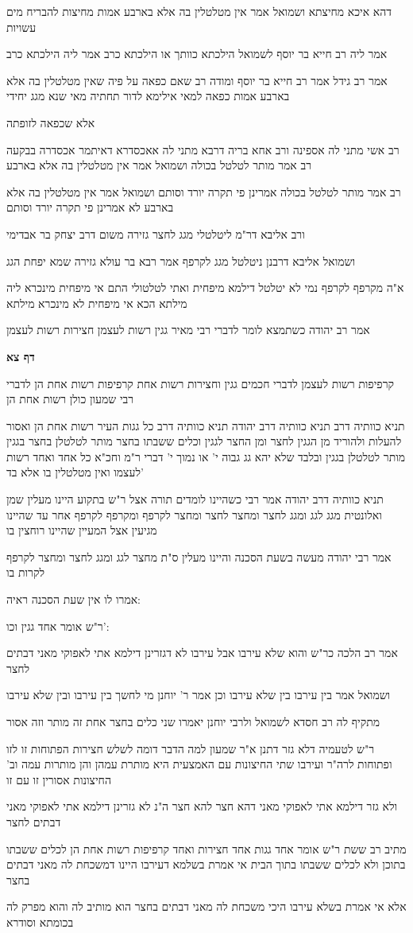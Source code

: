 \documentclass[12pt, openany]{book}
\newcommand{\sethebfont}{
\fontsize{10.5pt}{21.0pt} \selectfont
}
\newcommand{\textblock}[1]{
{\sethebfont #1\\}	
}
\newcommand{\sectname}{}
\newcommand{\newsection}[1]{
	\addcontentsline{toc}{section}{#1}
	\renewcommand{\sectname}{#1}	
	\vspace{-\baselineskip}
	\begin{center}
		\textbf{%
\fontsize{16pt}{16pt}\selectfont
			#1}
	\end{center}
	\vspace{-\baselineskip}
	\nopagebreak
}
\begin{document}
\textblock{דהא איכא מחיצתא ושמואל אמר אין מטלטלין בה אלא בארבע אמות מחיצות להבריח מים עשויות}
\textblock{אמר ליה רב חייא בר יוסף לשמואל הילכתא כוותך או הילכתא כרב אמר ליה הילכתא כרב}
\textblock{אמר רב גידל אמר רב חייא בר יוסף ומודה רב שאם כפאה על פיה שאין מטלטלין בה אלא בארבע אמות כפאה למאי אילימא לדור תחתיה מאי שנא מגג יחידי}
\textblock{אלא שכפאה לזופתה}
\textblock{רב אשי מתני לה אספינה ורב אחא בריה דרבא מתני לה אאכסדרא דאיתמר אכסדרה בבקעה רב אמר מותר לטלטל בכולה ושמואל אמר אין מטלטלין בה אלא בארבע}
\textblock{רב אמר מותר לטלטל בכולה אמרינן פי תקרה יורד וסותם ושמואל אמר אין מטלטלין בה אלא בארבע לא אמרינן פי תקרה יורד וסותם}
\textblock{ורב אליבא דר"מ ליטלטלי מגג לחצר גזירה משום דרב יצחק בר אבדימי}
\textblock{ושמואל אליבא דרבנן ניטלטל מגג לקרפף אמר רבא בר עולא גזירה שמא יפחת הגג}
\textblock{א"ה מקרפף לקרפף נמי לא יטלטל דילמא מיפחית ואתי לטלטולי התם אי מיפחית מינכרא ליה מילתא הכא אי מיפחית לא מינכרא מילתא}
\textblock{אמר רב יהודה כשתמצא לומר לדברי רבי מאיר גגין רשות לעצמן חצירות רשות לעצמן}
\newsection{דף צא}
\textblock{קרפיפות רשות לעצמן לדברי חכמים גגין וחצירות רשות אחת קרפיפות רשות אחת הן לדברי רבי שמעון כולן רשות אחת הן}
\textblock{תניא כוותיה דרב תניא כוותיה דרב יהודה תניא כוותיה דרב כל גגות העיר רשות אחת הן ואסור להעלות ולהוריד מן הגגין לחצר ומן החצר לגגין וכלים ששבתו בחצר מותר לטלטלן בחצר בגגין מותר לטלטלן בגגין ובלבד שלא יהא גג גבוה י' או נמוך י' דברי ר"מ וחכ"א כל אחד ואחד רשות לעצמו ואין מטלטלין בו אלא בד'}
\textblock{תניא כוותיה דרב יהודה אמר רבי כשהיינו לומדים תורה אצל ר"ש בתקוע היינו מעלין שמן ואלונטית מגג לגג ומגג לחצר ומחצר לחצר ומחצר לקרפף ומקרפף לקרפף אחר עד שהיינו מגיעין אצל המעיין שהיינו רוחצין בו}
\textblock{אמר רבי יהודה מעשה בשעת הסכנה והיינו מעלין ס"ת מחצר לגג ומגג לחצר ומחצר לקרפף לקרות בו}
\textblock{אמרו לו אין שעת הסכנה ראיה:}
\textblock{ר"ש אומר אחד גגין וכו':}
\textblock{אמר רב הלכה כר"ש והוא שלא עירבו אבל עירבו לא דגזרינן דילמא אתי לאפוקי מאני דבתים לחצר}
\textblock{ושמואל אמר בין עירבו בין שלא עירבו וכן אמר ר' יוחנן מי לחשך בין עירבו ובין שלא עירבו}
\textblock{מתקיף לה רב חסדא לשמואל ולרבי יוחנן יאמרו שני כלים בחצר אחת זה מותר וזה אסור}
\textblock{ר"ש לטעמיה דלא גזר דתנן א"ר שמעון למה הדבר דומה לשלש חצירות הפתוחות זו לזו ופתוחות לרה"ר ועירבו שתי החיצונות עם האמצעית היא מותרת עמהן והן מותרות עמה וב' החיצונות אסורין זו עם זו}
\textblock{ולא גזר דילמא אתי לאפוקי מאני דהא חצר להא חצר ה"נ לא גזרינן דילמא אתי לאפוקי מאני דבתים לחצר}
\textblock{מתיב רב ששת ר"ש אומר אחד גגות אחד חצירות ואחד קרפיפות רשות אחת הן לכלים ששבתו בתוכן ולא לכלים ששבתו בתוך הבית אי אמרת בשלמא דעירבו היינו דמשכחת לה מאני דבתים בחצר}
\textblock{אלא אי אמרת בשלא עירבו היכי משכחת לה מאני דבתים בחצר הוא מותיב לה והוא מפרק לה בכומתא וסודרא}
\end{document}
